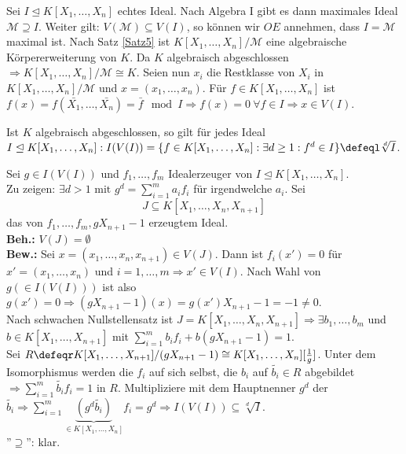 \begin{Bew}
  Sei $I \trianglelefteq K[X_1, \dots, X_n]$ echtes Ideal. Nach Algebra I gibt es dann maximales Ideal $\mathcal{M} \supseteq I$. Weiter gilt: $V(\mathcal{M}) \subseteq V(I)$, so können wir $O\!\!E$ annehmen, dass $I = \mathcal{M}$ maximal ist.
  Nach Satz \ref{Satz5} ist $K[X_1, \dots, X_n]/\mathcal{M}$ eine algebraische Körpererweiterung von $K$.
  Da $K$ algebraisch abgeschlossen $\Rightarrow K[X_1, \dots, X_n]/\mathcal{M} \cong K$.
  Seien nun $x_i$ die Restklasse von $X_i$ in $K[X_1, \dots, X_n]/\mathcal{M}$ und $x = (x_1, \dots, x_n)$.
  Für $f \in K[X_1, \dots, X_n]$ ist $f(x) = f(\bar{X_1}, \dots, \bar{X_n}) = \bar{f} \mod I \Rightarrow f(x) = 0\ \forall f \in I \Rightarrow x \in V(I)$.
\end{Bew}

\begin{nnSatz}
  Ist $K$ algebraisch abgeschlossen, so gilt für jedes Ideal $I \trianglelefteq K[X_1, \dots, X_n]: I(V(I)) = \{ f \in K[X_1, \dots, X_n]: \exists d \ge 1: f^d \in I \} \defeql \sqrt[d]{I}$.
\end{nnSatz}

\begin{Bew}
  Sei $g \in I(V(I))$ und $f_1, \dots, f_m$ Idealerzeuger von $I \trianglelefteq K[X_1, \dots, X_n]$.\\
  Zu zeigen: $\exists d > 1 \text{ mit } g^d = \sum_{i = 1}^m a_i f_i$ für irgendwelche $a_i$.
  Sei 
  \[
  J \subseteq K[X_1, \dots, X_n, X_{n+1}]
  \]
  das von $f_1, \dots, f_m, gX_{n+1}-1$ erzeugtem Ideal.\\
  \textbf{Beh.:} $V(J) = \emptyset$\\
  \textbf{Bew.:} Sei $x = (x_1, \dots, x_n, x_{n+1}) \in V(J)$.
  Dann ist $f_i(x') = 0$ für $x' = (x_1, \dots, x_n)$ und $i = 1, \dots, m \Rightarrow x' \in V(I)$.
  Nach Wahl von $g (\in I(V(I)))$ ist also $g(x') = 0 \Rightarrow (gX_{n+1}-1)(x) = g(x') X_{n+1} - 1 = -1 \not= 0$.\\
  Nach schwachen Nullstellensatz ist $J = K[X_1, \dots, X_n,X_{n+1}] \Rightarrow \exists b_1,
  \dots, b_m$ und $b \in K[X_1, \dots, X_{n+1}]$ mit $\sum_{i=1}^m b_i f_i + b(gX_{n+1} - 1) = 1$.\\
  Sei $R \defeqr K[X_1, \dots, X_{n+1}]/ (gX_{n+1} - 1) \cong K[X_1, \dots, X_n][\frac{1}{g}]$. Unter dem Isomorphismus werden die $f_i$ auf sich selbst, die $b_i$ auf $\tilde{b_i} \in R$ abgebildet $\Rightarrow \sum_{i = 1}^m \tilde{b_i} f_i = 1 \text{ in } R$.
  Multipliziere mit dem Hauptnenner $g^d$ der $\tilde{b_i} \Rightarrow \sum_{i = 1}^m \underset{\in K[X_1, \dots, X_n]}{\underbrace{(g^d \tilde{b_i})}} f_i = g^d \Rightarrow I(V(I)) \subseteq \sqrt[d]{I}$.\\
  ''$\supseteq$'': klar.
\end{Bew}
